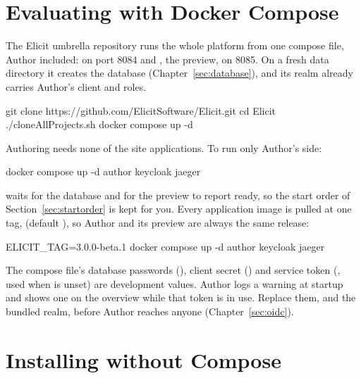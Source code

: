 \documentclass[11pt, a4paper]{article}
\begin{document}
\section{Evaluating with Docker Compose}
\label{sec:compose}

The Elicit umbrella repository runs the whole platform from one compose file, Author
included:  on port 8084 and , the preview, on 8085. On a fresh
data directory it creates the  database (Chapter~\ref{sec:database}), and its
realm already carries Author's client and roles.

\begin{elicitcmd}
git clone https://github.com/ElicitSoftware/Elicit.git
cd Elicit
./cloneAllProjects.sh
docker compose up -d
\end{elicitcmd}

Authoring needs none of the site applications. To run only Author's side:

\begin{elicitcmd}
docker compose up -d author keycloak jaeger
\end{elicitcmd}

 waits for the database and for the preview to report ready, so the start order
of Section~\ref{sec:startorder} is kept for you. Every application image is pulled at one tag,
 (default ), so Author and its preview are always the same
release:

\begin{elicitcmd}
ELICIT_TAG=3.0.0-beta.1 docker compose up -d author keycloak jaeger
\end{elicitcmd}

\begin{elicitsecurity}
The compose file's database passwords (), client secret () and
service token (, used when
 is unset) are development values. Author logs a warning at startup
and shows one on the  overview while that token is in use. Replace them, and the
bundled realm, before Author reaches anyone
(Chapter~\ref{sec:oidc}).
\end{elicitsecurity}

\section{Installing without Compose}
\label{sec:images}
\end{document}
